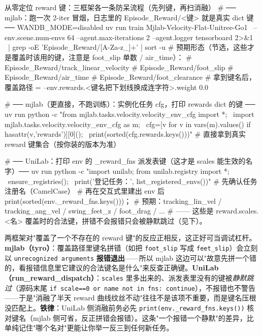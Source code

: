 \begin{codebox}[bash]{从零定位 reward 键：三框架各一条防呆流程（先列键，再扫消融）}
# ── mjlab：跑一次 2-iter 冒烟，日志里的 Episode_Reward/<键> 就是真实 dict 键 ──
WANDB_MODE=disabled uv run train Mjlab-Velocity-Flat-Unitree-Go1 \
  --env.scene.num-envs 64 --agent.max-iterations 2 --agent.logger tensorboard 2>&1 \
  | grep -oE 'Episode_Reward/[A-Za-z_]+' | sort -u
# 预期形态（节选，这些才是覆盖时该用的键，注意是 foot_slip 单数 / air_time）：
#   Episode_Reward/track_linear_velocity
#   Episode_Reward/foot_slip
#   Episode_Reward/air_time
#   Episode_Reward/foot_clearance
# 拿到键名后，覆盖路径 = --env.rewards.<键名把下划线换成连字符>.weight 0.0

# ── mjlab（更直接，不跑训练）：实例化任务 cfg，打印 rewards dict 的键 ──
uv run python -c "from mjlab.tasks.velocity.velocity_env_cfg import *; \
import mjlab.tasks.velocity.velocity_env_cfg as m; \
cfg=[v for v in vars(m).values() if hasattr(v,'rewards')][0](); \
print(sorted(cfg.rewards.keys()))"   # 直接拿到真实 reward 键集合（按你装的版本为准）

# ── UniLab：打印 env 的 _reward_fns 派发表键（这才是 scales 能生效的名字）──
uv run python -c "import unilab; from unilab.registry import *; \
ensure_registries(); \
print('登记任务：', list_registered_envs())"          # 先确认任务注册名（CamelCase）
# 再在交互式里建出 env 后 print(sorted(env._reward_fns.keys()))；
# 预期：tracking_lin_vel / tracking_ang_vel / swing_feet_z / foot_drag / ...
#   —— 这些是 reward.scales.<名> 覆盖时的合法键，拼错不会报错只会被静默跳过（见下）。
\end{codebox}

\begin{insight}\label{ins:rlmc-rew-keytypo}
两框架对"覆盖了一个不存在的 reward 键"的反应正相反，这正好可当调试杠杆。\textbf{mjlab（tyro）}：覆盖路径里键名拼错（如把 \verb|foot_slip| 写成 \verb|feet_slip|）会立刻以 \verb|unrecognized arguments| \textbf{报错退出}——所以 mjlab 这边可以"故意先拼一个错的，看报错信息里它建议的合法键名是什么"来反查正确键。\textbf{UniLab（run\_reward\_dispatch）}：\verb|scales| 里多出来的、派发表里没有的键被\emph{静默跳过}（源码末尾 \verb|if scale==0 or name not in fns: continue|），不报错也不警告——于是"消融了半天 reward 曲线纹丝不动"往往不是该项不重要，而是键名压根没匹配上。\textbf{铁律}：UniLab 侧消融前务必先 \verb|print(env._reward_fns.keys())| 核对键名（mjlab 侧可省，反正拼错会报错）。这条"一个报错一个静默"的差异，比单纯记住"哪个名对"更能让你举一反三到任何新任务。
\end{insight}

